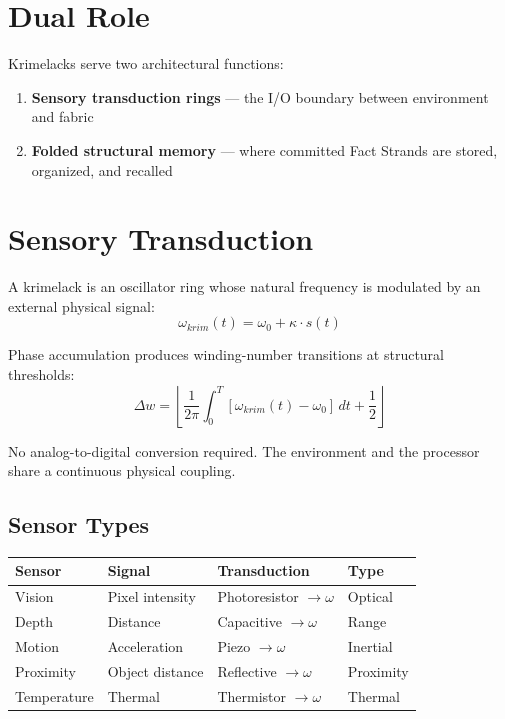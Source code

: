 \documentclass[11pt, a4paper]{report}
\begin{document}
\section{Dual Role}

Krimelacks serve two architectural functions:
\begin{enumerate}[nosep]
  \item \textbf{Sensory transduction rings} --- the I/O boundary between
        environment and fabric
  \item \textbf{Folded structural memory} --- where committed Fact Strands
        are stored, organized, and recalled
\end{enumerate}

\section{Sensory Transduction}

A krimelack is an oscillator ring whose natural frequency is modulated by
an external physical signal:
\begin{equation}
  \omega_{krim}(t) = \omega_0 + \kappa \cdot s(t)
\end{equation}

Phase accumulation produces winding-number transitions at structural
thresholds:
\begin{equation}
  \Delta w = \left\lfloor \frac{1}{2\pi} \int_0^T [\omega_{krim}(t) - \omega_0]\, dt + \frac{1}{2} \right\rfloor
\end{equation}

No analog-to-digital conversion required. The environment and the
processor share a continuous physical coupling.

\subsection{Sensor Types}

\begin{center}
\begin{tabular}{@{}llll@{}}
\toprule
\textbf{Sensor} & \textbf{Signal} & \textbf{Transduction} & \textbf{Type} \\
\midrule
Vision & Pixel intensity & Photoresistor $\to \omega$ & Optical \\
Depth & Distance & Capacitive $\to \omega$ & Range \\
Motion & Acceleration & Piezo $\to \omega$ & Inertial \\
Proximity & Object distance & Reflective $\to \omega$ & Proximity \\
Temperature & Thermal & Thermistor $\to \omega$ & Thermal \\
\bottomrule
\end{tabular}
\end{center}
\end{document}
